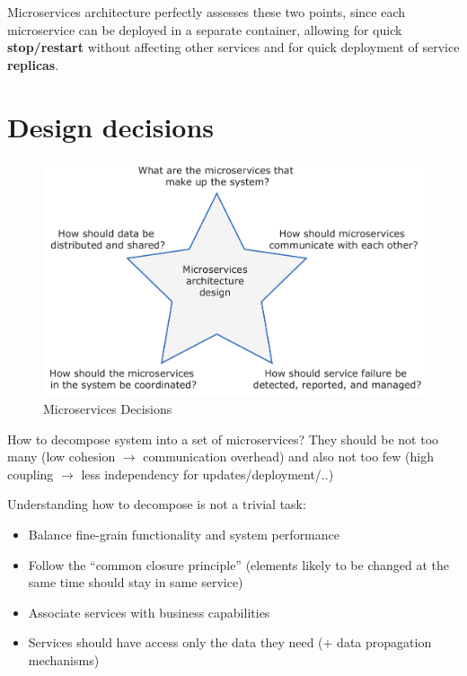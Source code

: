Microservices architecture perfectly assesses these two points, since each microservice can be deployed in a separate container, allowing for
quick \textbf{stop/restart} without affecting other services
and for quick deployment of service \textbf{replicas}.

\section{Design decisions}
\begin{figure}[htbp]
   \centering
   \includegraphics{images/microservices_decisions.png}
   \caption{Microservices Decisions}
   \label{fig:microservices_decisions}
\end{figure}

How to decompose system into a set of microservices?
They should be
not too many (low cohesion $\longrightarrow$ communication overhead) and also
not too few (high coupling $\longrightarrow$ less independency for updates/deployment/..)

Understanding how to decompose is not a trivial task:

\begin{itemize}[topsep=0em]
   \item Balance fine-grain functionality and system performance
   \item Follow the “common closure principle”
   (elements likely to be changed at the same time should stay in same service)
   \item Associate services with business capabilities
   \item Services should have access only the data they need
   (+ data propagation mechanisms)
\end{itemize}

